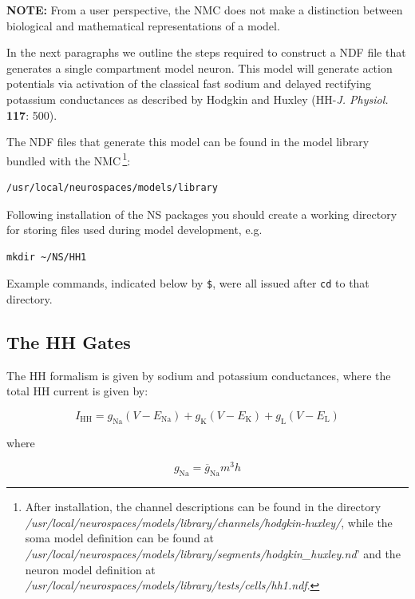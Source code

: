 \documentclass[12pt]{article}
\begin{document}
{\bf NOTE:} From a user perspective, the NMC does not make a distinction between
biological and mathematical representations of a model.  

In the next paragraphs we outline the steps required to construct a
NDF file that generates a single compartment model neuron.  This model
will generate action potentials via activation of the
classical fast sodium and delayed rectifying potassium conductances as
described by Hodgkin and Huxley (HH-{\it J. Physiol.} {\bf 117}: 500).

The NDF files that generate this model can be found in the model
library bundled with the NMC\,\footnote{After installation, the channel descriptions can be found in the directory\\
  {\it /usr/local/neurospaces/models/library/channels/hodgkin-huxley/},
  while the soma model definition can be found at
  {\it /usr/local/neurospaces/models/library/segments/hodgkin\_huxley.nd}'
  and the neuron model definition at
  {\it /usr/local/neurospaces/models/library/tests/cells/hh1.ndf}.}:
\begin{verbatim}
/usr/local/neurospaces/models/library
\end{verbatim}

Following installation of the NS packages you should create a working
directory for storing files used during model development, e.g.
\begin{verbatim}
mkdir ~/NS/HH1
\end{verbatim}
Example commands, indicated below by {\tt \$},
were all issued after {\tt cd} to that directory.

\subsection{The HH Gates}

The HH formalism is given by sodium and potassium conductances, where
the total HH current is given by:

\begin{equation}
  \label{eq:hodgkin-huxley-current}
  I_{\mathrm{HH}} = g_{\mathrm{Na}} (V-E_{\mathrm{Na}})
  + g_{\mathrm{K}} (V-E_{\mathrm{K}}) +
  g_{\mathrm{L}}(V-E_{\mathrm{L}})
\end{equation}

where

\begin{equation}
  \label{eq:g-na}
  g_{\mathrm{Na}} = \overline{g}_{\mathrm{Na}}m^3h
\end{equation}
\end{document}
